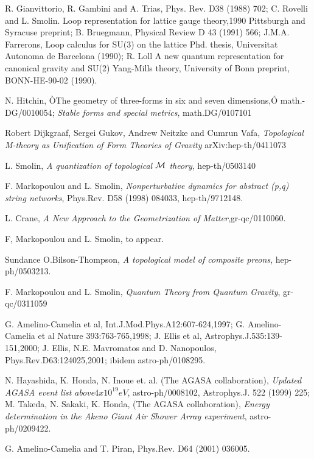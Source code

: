 \documentclass[12pt]{article}
\begin{document}
\begin{thebibliography}{0}
{{{R. Gianvittorio, R. Gambini and A. Trias, Phys. Rev.
D38 (1988) 702; C.
Rovelli and L. Smolin. Loop representation for lattice gauge theory,1990
Pittsburgh and Syracuse preprint; B. Bruegmann, Physical Review D 43
(1991) 566; J.M.A. Farrerons, Loop calculus for SU(3) on the lattice Phd.
thesis, Universitat Autonoma de Barcelona (1990); R. Loll A new quantum
representation for canonical gravity and SU(2) Yang-Mills theory, University
of Bonn preprint, BONN-HE-90-02 (1990).

N. Hitchin, ÒThe geometry of three-forms in six and seven dimensions,Ó math.-
DG/0010054;  {\it  Stable forms and special metrics}, math.DG/0107101 

Robert Dijkgraaf, Sergei Gukov, Andrew Neitzke and Cumrun Vafa, 
{\it Topological M-theory as Unification
of Form Theories of Gravity} 
arXiv:hep-th/0411073 

L. Smolin, {\it A quantization of topological 
$\cal M$ theory},   hep-th/0503140

F. Markopoulou and L. Smolin, {\it Nonperturbative dynamics for abstract (p,q) string networks}, Phys.Rev. D58 (1998) 084033, hep-th/9712148.

L. Crane, {\it A New Approach to the Geometrization of Matter},gr-qc/0110060.

F, Markopoulou and L. Smolin, to appear. 

Sundance O.Bilson-Thompson,  
{\it A topological model of composite preons}, 
hep-ph/0503213.  

F. Markopoulou and L. Smolin, {\it Quantum Theory from Quantum Gravity}, gr-qc/0311059  

G. Amelino-Camelia et al, Int.J.Mod.Phys.A12:607-624,1997;
G. Amelino-Camelia et al Nature 393:763-765,1998;
J. Ellis et al, Astrophys.J.535:139-151,2000;
J. Ellis, N.E. Mavromatos and D. Nanopoulos,
Phys.Rev.D63:124025,2001; ibidem astro-ph/0108295.

N. Hayashida, K. Honda, N. Inoue et. al. (The AGASA 
collaboration), { \it Updated AGASA event list above$ 4x10^19eV$},
astro-ph/0008102,  Astrophys.J. 522 (1999) 225;
M. Takeda, N. Sakaki, K. Honda, (The AGASA collaboration),
{\it Energy determination in the Akeno Giant Air Shower Array 
experiment}, astro-ph/0209422. 

 G. Amelino-Camelia and T. Piran,
Phys.Rev. D64 (2001) 036005.

}}}
\end{thebibliography}
\end{document}
